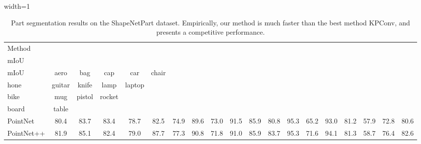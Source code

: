 \begin{table*}[]
    \centering
    \caption{Part segmentation results on the ShapeNetPart dataset. Empirically, our method is much faster than the best method KPConv, and presents a competitive performance.}
    \label{tab:part_segmentation}
    \vspace{1mm}
    \begin{adjustbox}{width=1\textwidth}
    \begin{tabular}{l|cc|cccccccccccccccc}
        \toprule 
         Method& \makecell{ Cls.\\mIoU}& \makecell{ Inst.\\mIoU}&aero &bag &cap &car &chair &\makecell{ aerp-\\hone} &guitar &knife &lamp &laptop &\makecell{ motor-\\bike} &mug &pistol &rocket  &\makecell{ skate-\\board} & table \\
         \midrule
         PointNet&80.4&83.7 &83.4 &78.7 &82.5 &74.9 &89.6 &73.0 &91.5 &85.9 &80.8 &95.3 &65.2 &93.0 &81.2 &57.9 &72.8 &80.6 \\
         
         PointNet++&81.9&85.1 &82.4 &79.0 &87.7 &77.3 &90.8 &71.8 &91.0 &85.9 &83.7 &95.3 &71.6 &94.1 &81.3 &58.7 &76.4  &82.6 \\
         

\end{tabular}
\end{adjustbox}
\end{table*}

